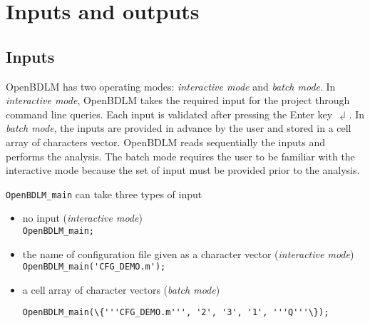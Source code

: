 \section{Inputs and outputs}
\label{S:OpenBDLMINPUTOUTPUT}

\subsection{Inputs}
\label{SS:OpenBDLMinput}


OpenBDLM has two operating modes: \emph{interactive mode} and \emph{batch mode}. In \emph{interactive mode}, OpenBDLM takes the required input for the project through \MATLAB{} command line queries. Each input is validated after pressing the Enter key $\dlsh$. In \emph{batch mode}, the inputs are provided in advance by the user and stored in a cell array of characters vector. OpenBDLM reads sequentially the inputs and performs the analysis. The batch mode requires the user to be familiar with the interactive mode because the set of input must be provided prior to the analysis. {\lstinline[basicstyle = \mlttfamily \small]!OpenBDLM_main! can take three types of input
\begin{itemize}
  \item no input (\emph{interactive mode}) \\ 
  
  \colorbox{light-gray}{\lstinline[basicstyle = \mlttfamily \small]!OpenBDLM_main;!} \\  
  \item the name of configuration file given as a character vector  (\emph{interactive mode}) \\ 
  
    \colorbox{light-gray}{\lstinline[basicstyle = \mlttfamily \small]!OpenBDLM_main('CFG_DEMO.m');!} \\ 
      
  \item a cell array of character vectors  (\emph{batch mode}) \\
  
\raggedright{\colorbox{light-gray}{\lstinline[basicstyle = \mlttfamily \small]!OpenBDLM_main(\{'''CFG_DEMO.m''', '2', '3', '1', '''Q'''\});!}} \\
\end{itemize}

}

